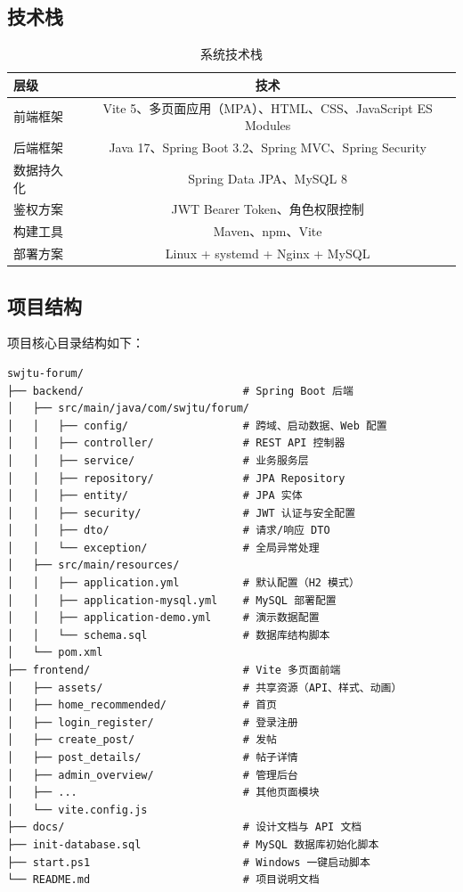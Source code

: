 \documentclass[bwprint]{report}
\begin{document}
\subsection{技术栈}

\begin{table}[H]
    \caption{系统技术栈}
    \label{tab:tech-stack}
    \centering
    \begin{tabular}{lc}
        \toprule[1.5pt]
        层级 & 技术 \\
        \midrule[1pt]
        前端框架 & Vite 5、多页面应用（MPA）、HTML、CSS、JavaScript ES Modules \\
        后端框架 & Java 17、Spring Boot 3.2、Spring MVC、Spring Security \\
        数据持久化 & Spring Data JPA、MySQL 8 \\
        鉴权方案 & JWT Bearer Token、角色权限控制 \\
        构建工具 & Maven、npm、Vite \\
        部署方案 & Linux + systemd + Nginx + MySQL \\
        \bottomrule[1.5pt]
    \end{tabular}
\end{table}

\subsection{项目结构}

项目核心目录结构如下：

\begin{lstlisting}
swjtu-forum/
├── backend/                         # Spring Boot 后端
│   ├── src/main/java/com/swjtu/forum/
│   │   ├── config/                  # 跨域、启动数据、Web 配置
│   │   ├── controller/              # REST API 控制器
│   │   ├── service/                 # 业务服务层
│   │   ├── repository/              # JPA Repository
│   │   ├── entity/                  # JPA 实体
│   │   ├── security/                # JWT 认证与安全配置
│   │   ├── dto/                     # 请求/响应 DTO
│   │   └── exception/               # 全局异常处理
│   ├── src/main/resources/
│   │   ├── application.yml          # 默认配置（H2 模式）
│   │   ├── application-mysql.yml    # MySQL 部署配置
│   │   ├── application-demo.yml     # 演示数据配置
│   │   └── schema.sql               # 数据库结构脚本
│   └── pom.xml
├── frontend/                        # Vite 多页面前端
│   ├── assets/                      # 共享资源（API、样式、动画）
│   ├── home_recommended/            # 首页
│   ├── login_register/              # 登录注册
│   ├── create_post/                 # 发帖
│   ├── post_details/                # 帖子详情
│   ├── admin_overview/              # 管理后台
│   ├── ...                          # 其他页面模块
│   └── vite.config.js
├── docs/                            # 设计文档与 API 文档
├── init-database.sql                # MySQL 数据库初始化脚本
├── start.ps1                        # Windows 一键启动脚本
└── README.md                        # 项目说明文档
\end{lstlisting}
\end{document}
